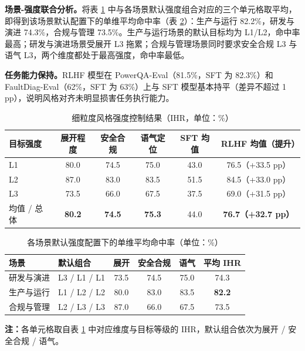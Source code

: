\documentclass[fontset=fandol,type=master,campus=shenzhen,etitleauto=true]{hithesisbook}
\begin{document}
\textbf{场景-强度联合分析。}将表 \ref{tab:intensity-results} 中与各场景默认强度组合对应的三个单元格取平均，即得到该场景默认配置下的单维平均命中率（表 \ref{tab:scene-intensity-results}）：生产与运行 82.2\%，研发与演进 74.3\%，合规与管理 73.5\%。生产与运行场景的默认目标均为 L1/L2，命中率最高；研发与演进场景受展开 L3 拖累；合规与管理场景同时要求安全合规 L3 与语气 L3，两个维度都处于最高强度，命中率最低。

\textbf{任务能力保持。}RLHF 模型在 PowerQA-Eval（81.5\%，SFT 为 82.3\%）和 FaultDiag-Eval（62\%，SFT 为 63\%）上与 SFT 模型基本持平（差异不超过 1 pp），说明风格对齐未明显损害任务执行能力。

\begin{table}[htbp]
\centering
\caption{细粒度风格强度控制结果（IHR，单位：\%）}
\label{tab:intensity-results}
\small
\setlength{\tabcolsep}{6pt}
\renewcommand{\arraystretch}{1.15}
\begin{tabular}{l c c c c c}
\toprule
\textbf{目标强度} & \textbf{展开程度} & \textbf{安全合规} & \textbf{语气定位} & \textbf{SFT 均值} & \textbf{RLHF 均值（提升）} \\
\midrule
L1 & 80.0 & 74.5 & 75.0 & 43.0 & 76.5（+33.5 pp） \\
L2 & 87.0 & 83.0 & 83.5 & 51.5 & 84.5（+33.0 pp） \\
L3 & 73.5 & 66.0 & 67.5 & 37.5 & 69.0（+31.5 pp） \\
\midrule
均值 / 总体 & \textbf{80.2} & \textbf{74.5} & \textbf{75.3} & 44.0 & \textbf{76.7（+32.7 pp）} \\
\bottomrule
\end{tabular}
\end{table}

\begin{table}[htbp]
\centering
\caption{各场景默认强度配置下的单维平均命中率（单位：\%）}
\label{tab:scene-intensity-results}
\small
\renewcommand{\arraystretch}{1.15}
\begin{tabular}{l l c c c c}
\toprule
\textbf{场景} & \textbf{默认组合} & \textbf{展开} & \textbf{安全合规} & \textbf{语气} & \textbf{平均 IHR} \\
\midrule
研发与演进 & L3 / L1 / L1 & 73.5 & 74.5 & 75.0 & 74.3 \\
生产与运行 & L1 / L2 / L2 & 80.0 & 83.0 & 83.5 & \textbf{82.2} \\
合规与管理 & L2 / L3 / L3 & 87.0 & 66.0 & 67.5 & 73.5 \\
\bottomrule
\end{tabular}

\vspace{0.2cm}
{\small \textbf{注：}各单元格取自表 \ref{tab:intensity-results} 中对应维度与目标等级的 IHR，默认组合依次为展开 / 安全合规 / 语气。}
\end{table}
\end{document}
